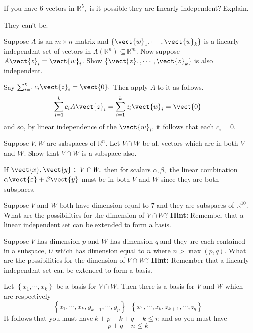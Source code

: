 \begin{enumialphparenastyle}
\begin{ex} If you have $6$ vectors in $\mathbb{R}^{5},$ is it possible they are
linearly independent? Explain.
\begin{sol}
They can't be.
\end{sol}
\end{ex}


\begin{ex} Suppose $A$ is an $m\times n$ matrix and $\left\{ \vect{w}
_{1},\cdots ,\vect{w}_{k}\right\} $ is a linearly independent set of
vectors in $A\left( \mathbb{R}^{n}\right) \subseteq \mathbb{R}^{m}$. Now
suppose $A\vect{z}_{i}=\vect{w}_{i}$. Show $\left\{ 
\vect{z}_{1},\cdots ,\vect{z}_{k}\right\} $ is also independent. 
\begin{sol}
 Say $
\sum_{i=1}^{k}c_{i}\vect{z}_{i}=\vect{0}.$ Then apply $A$ to it as follows.
\[
\sum_{i=1}^{k}c_{i}A\vect{z}_{i}=\sum_{i=1}^{k}c_{i}\vect{w}_{i}=\vect{0}
\]
and so, by linear independence of the $\vect{w}_{i},$ it follows that each
$c_{i}=0$.
\end{sol}
\end{ex}

\begin{ex} Suppose $V, W$ are subspaces of $\mathbb{R}^{n}.$ Let $V\cap W$
be all vectors which are in both $V$ and $W$. Show that $V \cap W$ is a subspace also. 
\begin{sol}
If $\vect{x}, \vect{y}\in V\cap W,$ then for scalars $\alpha
,\beta ,$ the linear combination $\alpha \vect{x}+\beta \vect{y}$ must
be in both $V$ and $W$ since they are both subspaces.
\end{sol}
\end{ex}

\begin{ex} Suppose $V$ and $W$ both have dimension equal to $7$ and they are
subspaces of $\mathbb{R}^{10}.$ What are the possibilities for the dimension
of $V\cap W$? \textbf{Hint: }Remember that a linear independent set can be
extended to form a basis. \vspace{1mm}
\end{ex}

\begin{ex} Suppose $V$ has dimension $p$ and $W$ has dimension $q$ and they
are each contained in a subspace, $U$ which has dimension equal to $n$ where 
$n>\max \left( p,q\right) .$ What are the possibilities for the dimension of 
$V\cap W$? \textbf{Hint: }Remember that a linearly independent set can be
extended to form a basis. \vspace{1mm}
\begin{sol}
Let $\left\{ x_{1},\cdots ,x_{k}\right\} $ be a
basis for $V\cap W.$ Then there is a basis for $V$ and $W$ which are
respectively
\[
\left\{ x_{1},\cdots ,x_{k},y_{k+1},\cdots ,y_{p}\right\} ,\ \left\{
x_{1},\cdots ,x_{k},z_{k+1},\cdots ,z_{q}\right\}
\]
It follows that you must have $k+p-k+q-k\leq n$ and so you must have
\[
p+q-n\leq k
\]
\end{sol}
\end{ex}


\end{enumialphparenastyle}
